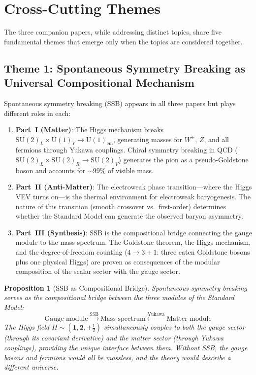 \documentclass[12pt]{article}
\newtheorem{proposition}[theorem]{Proposition}
\theoremstyle{definition}
\theoremstyle{remark}
\newcommand{\su}[1]{\mathrm{SU}(#1)}
\newcommand{\uu}[1]{\mathrm{U}(#1)}
\begin{document}
\section{Cross-Cutting Themes}
\label{sec:crosscutting}

The three companion papers, while addressing distinct topics, share five fundamental themes that emerge only when the topics are considered together.

\subsection{Theme 1: Spontaneous Symmetry Breaking as Universal Compositional Mechanism}

Spontaneous symmetry breaking (SSB) appears in all three papers but plays different roles in each:

\begin{enumerate}
\item \textbf{Part~I (Matter)}: The Higgs mechanism breaks $\su{2}_L \times \uu{1}_Y \to \uu{1}_{\mathrm{em}}$, generating masses for $W^\pm$, $Z$, and all fermions through Yukawa couplings. Chiral symmetry breaking in QCD ($\su{2}_L \times \su{2}_R \to \su{2}_V$) generates the pion as a pseudo-Goldstone boson and accounts for $\sim 99\%$ of visible mass.

\item \textbf{Part~II (Anti-Matter)}: The electroweak phase transition---where the Higgs VEV turns on---is the thermal environment for electroweak baryogenesis. The nature of this transition (smooth crossover vs.\ first-order) determines whether the Standard Model can generate the observed baryon asymmetry.

\item \textbf{Part~III (Synthesis)}: SSB is the compositional bridge connecting the gauge module to the mass spectrum. The Goldstone theorem, the Higgs mechanism, and the degree-of-freedom counting ($4 \to 3 + 1$: three eaten Goldstone bosons plus one physical Higgs) are proven as consequences of the modular composition of the scalar sector with the gauge sector.
\end{enumerate}

\begin{proposition}[SSB as Compositional Bridge]
\label{prop:ssb-bridge}
Spontaneous symmetry breaking serves as the compositional bridge between the three modules of the Standard Model:
\begin{equation}
\text{Gauge module} \xrightarrow{\text{SSB}} \text{Mass spectrum} \xleftarrow{\text{Yukawa}} \text{Matter module}
\end{equation}
The Higgs field $H \sim (\mathbf{1}, \mathbf{2}, +\tfrac{1}{2})$ simultaneously couples to both the gauge sector (through its covariant derivative) and the matter sector (through Yukawa couplings), providing the unique interface between them. Without SSB, the gauge bosons and fermions would all be massless, and the theory would describe a different universe.
\end{proposition}
\end{document}
